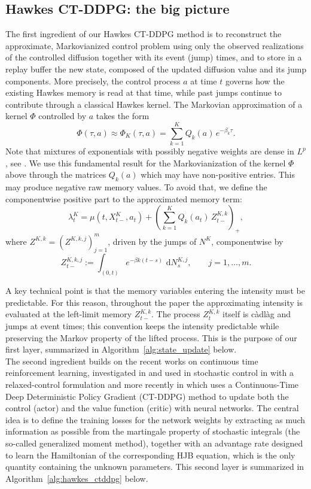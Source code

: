 \documentclass[11pt]{article}
\theoremstyle{remarkitalic}
\theoremstyle{remarkitalic}
\newcommand{\dd}{\,\mathrm d}
\newcommand{\1}{\mathbf 1}
\begin{document}
\subsection{Hawkes CT-DDPG: the big picture}

The first ingredient of our Hawkes CT-DDPG method is to reconstruct the approximate, Markovianized control problem using only the observed realizations of the controlled diffusion together with its event (jump) times, and to store in a replay buffer the new state, composed of the updated diffusion value and its jump components. More precisely, the control process $a$ at time $t$ governs how the existing Hawkes memory is read at that time, while past jumps continue to contribute through a classical Hawkes kernel. The Markovian approximation of a kernel $\Phi$ controlled by $a$ takes the form
\[
    \Phi(\tau,a) \approx \Phi_K(\tau,a) = \sum_{k=1}^K Q_k(a)\,e^{-\beta_k \tau}.
\]
 Note that mixtures of exponentials with possibly negative weights are dense in $L^p$, see \cite{KAMMLER1976384}. We use this fundamental result for the Markovianization of the kernel $\Phi$ above through the matrices $Q_k(a)$ which may have non-positive entries. This may produce negative raw memory values. To avoid that, we define the componentwise positive part to the approximated memory term:
\[
    \lambda_t^K
    =
    \mu(t,X_{t-}^K,a_t)
    +
    \left(\sum_{k=1}^K Q_k(a_t)\,Z_{t-}^{K,k}\right)_+,
\]
where $Z^{K,k}=(Z^{K,k,j})_{j=1}^m$, driven by the jumps of $N^K$, componentwise by
\begin{equation*}
Z_{t-}^{K,k,j}
:=
\int_{(0,t)} e^{-\beta k(t-s)}\,\dd N_s^{K,j},
\qquad j=1,\dots,m.
\end{equation*}  

A key technical point is that the memory variables entering the intensity must be predictable. For this reason, throughout the paper the approximating intensity is evaluated at the left-limit memory $Z_{t-}^{K,k}$. The process $Z_t^{K,k}$ itself is c\`adl\`ag and jumps at event times; this convention keeps the intensity predictable while preserving the Markov property of the lifted process. This is the purpose of our first layer, summarized in Algorithm~\ref{alg:state_update} below.\\

The second ingredient builds on the recent works on continuous time reinforcement learning, investigated in \cite{doya2000reinforcement} and used in stochastic control in \cite{wang2020reinforcement} with a relaxed-control formulation and more recently in \cite{ChengGuoZhang2026} which uses a Continuous-Time Deep Deterministic Policy Gradient (CT-DDPG) method to update both the control (actor) and the value function (critic) with neural networks. The central idea is to define the training losses for the network weights by extracting as much information as possible from the martingale property of stochastic integrals (the so-called generalized moment method), together with an advantage rate designed to learn the Hamiltonian of the corresponding HJB equation, which is the only quantity containing the unknown parameters. This second layer is summarized in Algorithm~\ref{alg:hawkes_ctddpg} below.\\
\end{document}
